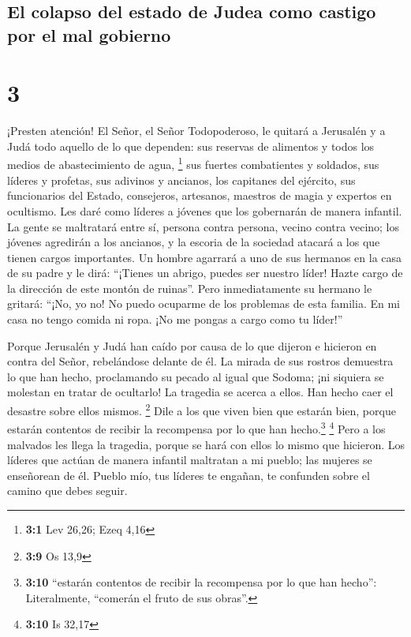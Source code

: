 \hypertarget{el-colapso-del-estado-de-judea-como-castigo-por-el-mal-gobierno}{%
\subsection{El colapso del estado de Judea como castigo por el mal
gobierno}\label{el-colapso-del-estado-de-judea-como-castigo-por-el-mal-gobierno}}

\hypertarget{section-2}{%
\section{3}\label{section-2}}

 ¡Presten atención! El Señor, el Señor Todopoderoso, le
quitará a Jerusalén y a Judá todo aquello de lo que dependen: sus
reservas de alimentos y todos los medios de abastecimiento de agua,
\footnote{\textbf{3:1} Lev 26,26; Ezeq 4,16}  sus fuertes
combatientes y soldados, sus líderes y profetas, sus adivinos y
ancianos,  los capitanes del ejército, sus funcionarios
del Estado, consejeros, artesanos, maestros de magia y expertos en
ocultismo.  Les daré como líderes a jóvenes que los
gobernarán de manera infantil.  La gente se maltratará
entre sí, persona contra persona, vecino contra vecino; los jóvenes
agredirán a los ancianos, y la escoria de la sociedad atacará a los que
tienen cargos importantes.  Un hombre agarrará a uno de
sus hermanos en la casa de su padre y le dirá: ``¡Tienes un abrigo,
puedes ser nuestro líder! Hazte cargo de la dirección de este montón de
ruinas''.  Pero inmediatamente su hermano le gritará:
``¡No, yo no! No puedo ocuparme de los problemas de esta familia. En mi
casa no tengo comida ni ropa. ¡No me pongas a cargo como tu líder!''

 Porque Jerusalén y Judá han caído por causa de lo que
dijeron e hicieron en contra del Señor, rebelándose delante de él.
 La mirada de sus rostros demuestra lo que han hecho,
proclamando su pecado al igual que Sodoma; ¡ni siquiera se molestan en
tratar de ocultarlo! La tragedia se acerca a ellos. Han hecho caer el
desastre sobre ellos mismos. \footnote{\textbf{3:9} Os 13,9}
 Dile a los que viven bien que estarán bien, porque
estarán contentos de recibir la recompensa por lo que han
hecho.\footnote{\textbf{3:10} ``estarán contentos de recibir la
  recompensa por lo que han hecho'': Literalmente, ``comerán el fruto de
  sus obras''.} \footnote{\textbf{3:10} Is 32,17}  Pero a
los malvados les llega la tragedia, porque se hará con ellos lo mismo
que hicieron.  Los líderes que actúan de manera infantil
maltratan a mi pueblo; las mujeres se enseñorean de él. Pueblo mío, tus
líderes te engañan, te confunden sobre el camino que debes seguir.

